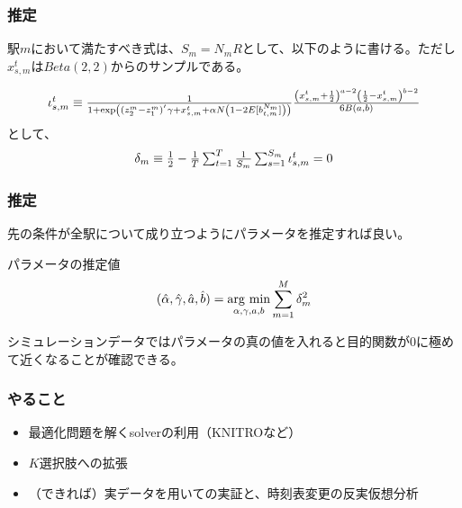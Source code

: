 \documentclass[dvipdfmx, 12pt]{beamer}
\begin{document}
\begin{frame}\frametitle{推定}
	駅$m$において満たすべき式は、$S_m = N_m R$として、以下のように書ける。ただし$x_{s, m}^t$は$Beta(2,2)$からのサンプルである。
	
	\begin{align*}
	\scalebox{1}{$
	\iota_{s, m}^t \equiv \frac{1}{1 + \exp\left( (z_2^m - z_1^m)^{'}\gamma + x_{s,m}^t + \alpha N \left(1 - 2E[b_{t,m}^{N_m}]\right) \right)} \frac{\left(x_{s,m}^t + \frac{1}{2}\right)^{a - 2} \left(\frac{1}{2} - x_{s,m}^t \right)^{b-2}}{6B(a, b)} $}
	\end{align*}
	として、
	\begin{align*}
	\scalebox{1}{$
	\delta_m \equiv \frac{1}{2} - \frac{1}{T}\sum_{t = 1}^T \frac{1}{S_m}\sum_{s = 1}^{S_m} \iota_{s, m}^t = 0 $}
	\end{align*}
\end{frame}

\begin{frame}\frametitle{推定}
	先の条件が全駅について成り立つようにパラメータを推定すれば良い。
	
	\begin{itembox}[l]{パラメータの推定値}
	\begin{align*}
		(\hat{\alpha}, \hat{\gamma}, \hat{a}, \hat{b}) = \mathop{\rm arg~min}\limits_{\alpha, \gamma, a, b} \sum_{m = 1}^M \delta_m^2
	\end{align*}
	\end{itembox}
	
	シミュレーションデータではパラメータの真の値を入れると目的関数が0に極めて近くなることが確認できる。
\end{frame}

\begin{frame}\frametitle{やること}
	\begin{itemize}
		\item 最適化問題を解くsolverの利用（KNITROなど）
		\item $K$選択肢への拡張
		\item （できれば）実データを用いての実証と、時刻表変更の反実仮想分析
	\end{itemize}
\end{frame}
\end{document}
